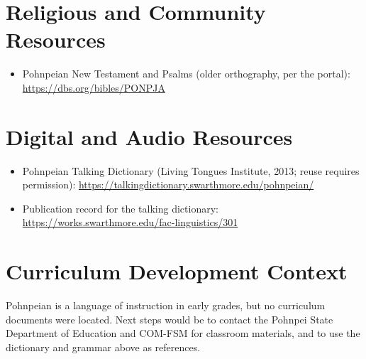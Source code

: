 \documentclass[12pt]{article}
\begin{document}
\section{Religious and Community Resources}
\begin{itemize}
\item Pohnpeian New Testament and Psalms (older orthography, per the portal): \url{https://dbs.org/bibles/PONPJA}
\end{itemize}

\section{Digital and Audio Resources}
\begin{itemize}
\item Pohnpeian Talking Dictionary (Living Tongues Institute, 2013; reuse requires permission): \url{https://talkingdictionary.swarthmore.edu/pohnpeian/}
\item Publication record for the talking dictionary: \url{https://works.swarthmore.edu/fac-linguistics/301}
\end{itemize}

\section{Curriculum Development Context}
Pohnpeian is a language of instruction in early grades, but no curriculum documents were located. Next steps would be to contact the Pohnpei State Department of Education and COM-FSM for classroom materials, and to use the dictionary and grammar above as references.
\end{document}
